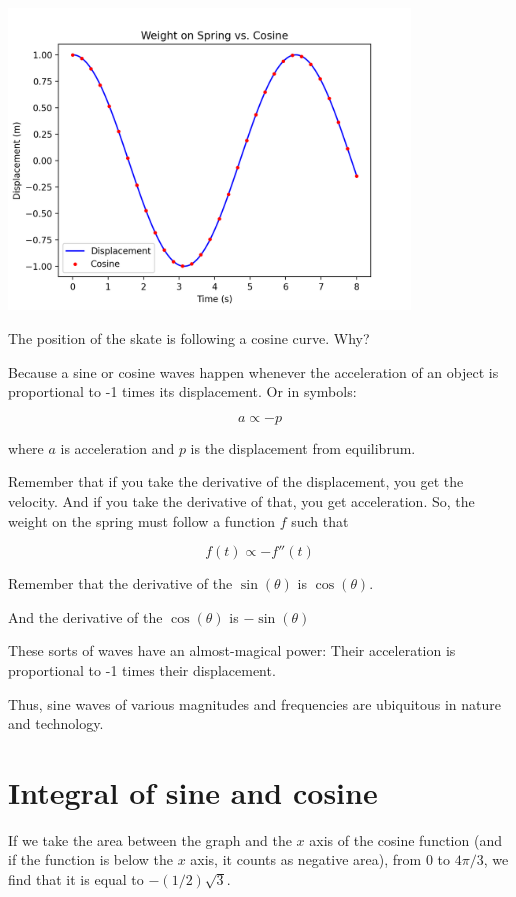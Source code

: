 \includegraphics[width=0.8\textwidth]{springpy.png}

The position of the skate is following a cosine curve. Why?

Because a sine or cosine waves happen whenever the acceleration of 
an object is proportional to -1 times its displacement. Or in symbols:

$$a \propto - p$$

where $a$ is acceleration and $p$ is the displacement from equilibrum.

Remember that if you take the derivative of the displacement, you get
the velocity. And if you take the derivative of that, you get
acceleration. So, the weight on the spring must follow a function $f$ such that

$$f(t) \propto - f''(t)$$

Remember that the derivative of the $\sin(\theta)$ is $\cos(\theta)$.

And the derivative of the $\cos(\theta)$ is $- \sin(\theta)$

These sorts of waves have an almost-magical power: Their
acceleration is proportional to -1 times their displacement.

Thus, sine waves of various magnitudes and frequencies are ubiquitous
in nature and technology.

\section{Integral of sine and cosine}

If we take the area between the graph and the $x$ axis of the cosine
function (and if the function is below the $x$ axis, it counts as
negative area), from 0 to $4\pi/3$, we find that it is equal to
$-(1/2)\sqrt{3}$.

